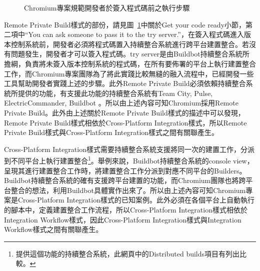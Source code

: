 \begin{figure}[h]
\fontsize{12pt}{10pt}\selectfont
\linespread{0.8}
\caption{Chromium專案規範開發者於簽入程式碼前之執行步驟}
\label{chromiumprojectcommitworkflow}
\end{figure}

Remote Private Build樣式的部份，請見圖~\ref{chromiumprojectcommitworkflow}中關於Get your code ready小節，第二項中“You can ask someone to pass it to the try server.”，在簽入程式碼進入版本控制系統前，開發者必須將程式碼置入持續整合系統進行跨平台建置整合。若沒有問題發生，開發者才可以簽入程式碼。try server是由Buildbot持續整合系統所擔綱，負責將未簽入版本控制系統的程式碼，在所有要佈署的平台上執行建置整合工作，而Chromium專案團隊為了將此實踐比較無縫的融入流程中，已經開發一些工具幫助開發者實踐上述的步驟。此外Remote Private Build必須依賴持續整合系統所提供的功能，有支援此功能的持續整合系統有Team City, Pulse, ElectricCommander, Buildbot\cite{continuousdelivery} 。所以由上述內容可知Chromium採用Remote Private Build。此外由上述關於Remote Private Build樣式的描述中可以發現，Remote Private Build樣式相依於Cross-Platform Integration樣式，所以Remote Private Build樣式與Cross-Platform Integration樣式之間有關聯產生。

Cross-Platform Integration樣式需要持續整合系統支援將同一次的建置工作，分派到不同平台上執行建置整合\footnote{提供這個功能的持續整合系統，此網頁中\cite{cimetrix}的Distributed builds項目有列出比較。}。舉例來說，Buildbot持續整合系統的console view\cite{buildbotconsoleview}，呈現其進行建置整合工作時，將建置整合工作分派到對應不同平台的Builders。Buildbot持續整合系統的確有支援跨平台建置的功能，而Chromium團隊也將跨平台整合的想法，利用Buildbot具體實作出來了。所以由上述內容可知Chromium專案是Cross-Platform Integration樣式的已知案例。此外必須在各個平台上自動執行的腳本中，定義建置整合工作流程，所以Cross-Platform Integration樣式相依於Integration Workflow樣式，因此Cross-Platform Integration樣式與Integration Workflow樣式之間有關聯產生。

